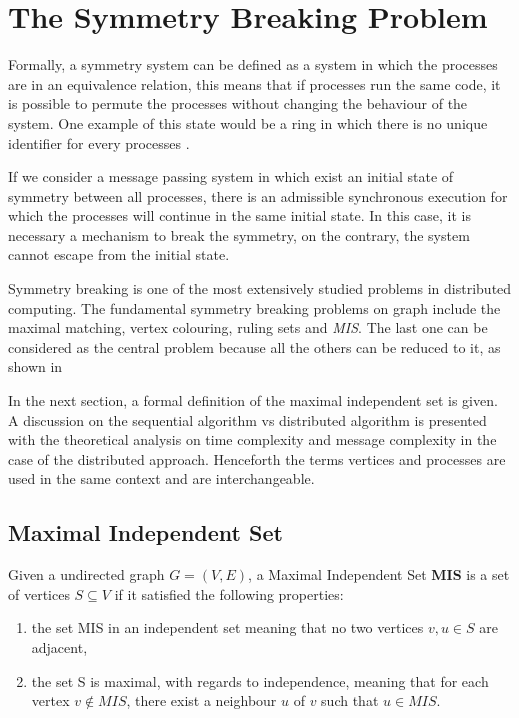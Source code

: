 \section{The Symmetry Breaking Problem}
\label{cap:2}

Formally, a symmetry system can be defined as a system in which the processes are in an equivalence relation, this means that if processes run the same code, it is possible to permute the processes without changing the behaviour of the system. One example of this state would be a ring in which there is no unique identifier for every processes \cite{boldi1996symmetry}.

If we consider a message passing system in which exist an initial state of symmetry between all processes, there is an admissible synchronous execution for which the processes will continue in the same initial state. In this case, it is necessary a mechanism to break the symmetry, on the contrary, the system cannot escape from the initial state.

Symmetry breaking is one of the most extensively studied problems in distributed computing. The fundamental symmetry breaking problems on graph include the maximal matching, vertex colouring, ruling sets and \textit{MIS}. The last one can be considered as the central problem because all the others can be reduced to it, as shown in  \cite{linial1992locality}

In the next section, a formal definition of the maximal independent set is given. A  discussion on the sequential algorithm vs distributed algorithm is presented with the theoretical analysis on time complexity and message complexity in the case of the distributed approach. Henceforth the terms vertices and processes are used in the same context and are interchangeable.    

\subsection{Maximal Independent Set}

\theoremstyle{definition}
\begin{definition}

Given a undirected graph $G = (V,E)$, a Maximal Independent Set \textbf{MIS} is a set of vertices $S \subseteq V$ if it satisfied the following properties:   

\begin{enumerate}
  \item the set MIS in an independent set meaning that no two vertices $v,u \in S$ are adjacent,
  \item the set S is maximal, with regards to independence, meaning that for each vertex $v \notin MIS$, there exist a neighbour $u$ of $v$ such that $u \in MIS$.
\end{enumerate}

\end{definition}

